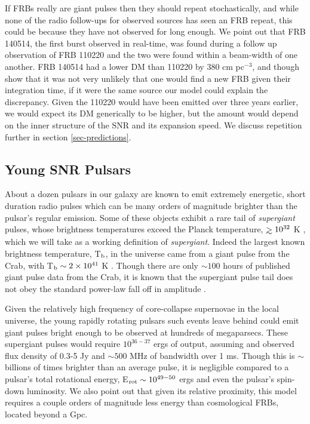 \documentclass[useAMS,usenatbib]{mn2e}
\def\gtrsim{\mathrel{\hbox{\rlap{\hbox{\lower4pt\hbox{$\sim$}}}\hbox{$>$}}}}
\begin{document}
If FRBs really are giant pulses then they 
should repeat stochastically, and while none of the radio follow-ups for 
observed sources has seen an FRB repeat, this could be because they
have not observed for long enough. We point out that FRB 140514, 
the first burst observed in real-time, was found during a follow up observation
of FRB 110220 and the two were found within a beam-width of one another.
FRB 140514 had a lower DM than 110220 by 380 cm pc$^{-3}$, 
and though \cite{2014arXiv1412.0342P} show that it was not very unlikely that one would find a 
new FRB given their integration time, if it were the same source 
our model could explain the discrepancy. 
Given the 110220 would have been emitted over three years earlier, we 
would expect its DM generically to be higher, but the amount would 
depend on the inner structure of the SNR and its expansion speed. 
We discuss repetition further in section \ref{sec-predictions}.

\subsection{Young SNR Pulsars}

About a dozen pulsars in our galaxy are known to emit extremely energetic,
short duration radio pulses which can be many orders of magnitude 
brighter than the pulsar's regular emission. Some of these objects exhibit 
a rare tail of \textit{supergiant} pulses, whose brightness temperatures 
exceed the Planck temperature, $\gtrsim10^{32}$ K \citep{2004ApJ...612..375C},
which we will take as a working definition of \textit{supergiant}. 
Indeed the largest
known brightness temperature, T$_{\rm b}$, in the universe came from a giant pulse from the Crab,
 with T$_{\rm b}\sim2\times10^{41}$ K \citep{2014ApJ...792..135T}. Though there
are only $\sim100$ hours of published giant pulse data from the Crab, it is known
that the supergiant pulse tail does not obey the standard power-law fall off
in amplitude \citep{2012ApJ...760...64M}.

Given the relatively high frequency of core-collapse supernovae 
in the local universe, the young 
rapidly rotating pulsars such events leave behind could emit giant 
pulses bright enough to be observed at hundreds of megaparsecs. 
These supergiant pulses would require $10^{36 - 37}$ ergs of output,
assuming and observed flux density of 0.3-5 Jy and $\sim500$ 
MHz of bandwidth over 1 ms. Though this is $\sim$ billions of times
brighter than an average pulse, it is negligible compared to a 
pulsar's total rotational energy, E$_{\rm rot} \sim 10^{49-50}$ ergs and
even the pulsar's spin-down luminosity. We
also point out that given its relative proximity, this model requires
a couple orders of magnitude less energy than cosmological FRBs,
located beyond a Gpc. 
\end{document}
